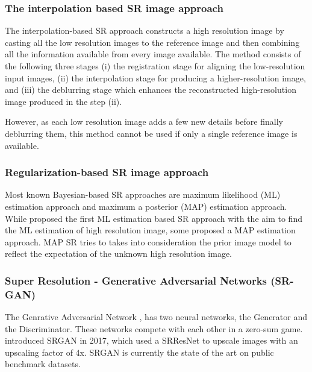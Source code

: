 \documentclass{article} %
\begin{document}
\subsubsection{The interpolation based SR image approach}
\hspace*{0.167 in} The interpolation-based SR approach constructs a high resolution image by casting all the low resolution images to the reference image and then combining all the information available from every image available.
    The method consists of the following three stages
    (i) the registration stage for aligning the low-resolution input images,
    (ii) the interpolation stage for producing a higher-resolution image, and
    (iii) the deblurring stage which enhances the
    reconstructed high-resolution image produced in the step (ii).
    
    However, as each low resolution image adds a few new details before finally deblurring them, this method cannot be used if only a single reference image is available.\\
    
\subsubsection{Regularization-based SR image approach}
\hspace*{0.167 in} Most known Bayesian-based SR approaches are maximum likelihood (ML) estimation approach  and maximum a posterior (MAP) estimation approach.\\
    \hspace*{0.167 in}  While \cite{Brian1996ML} proposed the first ML estimation based SR approach with the aim to find the ML estimation of high resolution image, some proposed a MAP estimation approach. MAP SR tries to takes into consideration the prior image model to reflect the expectation of the unknown high resolution image.\\
    
\subsubsection{Super Resolution - Generative Adversarial Networks (SR-GAN)}
\hspace*{0.167 in} The Genrative Adversarial Network \citep{goodfellow2014generative}, has two neural networks, the Generator and the Discriminator. These networks compete with each other in a zero-sum game.
    \cite{ledig2017photorealistic} introduced SRGAN in 2017, which used a SRResNet to upscale images with an upscaling factor of 4x. SRGAN is currently the state of the art on public benchmark datasets.
    
\end{document}
